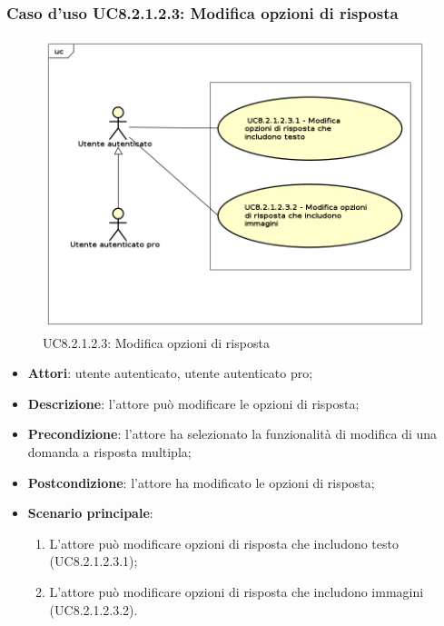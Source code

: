 \subsubsection{Caso d'uso UC8.2.1.2.3: Modifica opzioni di risposta}
	\label{UC8.2.1.2.3}
	\begin{figure}[h]
		\centering
			\includegraphics[scale=0.45,keepaspectratio]{UML/UC8_2_1_2_3.png}
		\caption{UC8.2.1.2.3: Modifica opzioni di risposta}
	\end{figure}
	\FloatBarrier
	\begin{itemize}
		\item
			\textbf{Attori}: utente autenticato, utente autenticato pro;
		\item		
			\textbf{Descrizione}: l'attore può modificare le opzioni di risposta;
		\item
			\textbf{Precondizione}: l'attore ha selezionato la funzionalità di modifica di una domanda a risposta multipla;
		\item
			\textbf{Postcondizione}: l'attore ha modificato le opzioni di risposta;
		\item
			\textbf{Scenario principale}:
	       		\begin{enumerate}
	       			\item
	       			L'attore può modificare opzioni di risposta che includono testo (UC8.2.1.2.3.1);
					\item
					L'attore può modificare opzioni di risposta che includono immagini (UC8.2.1.2.3.2).
	 			\end{enumerate}
	\end{itemize}	
	
